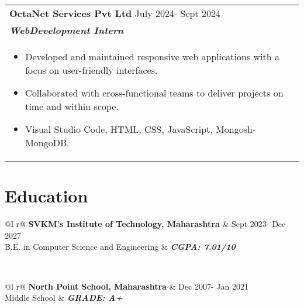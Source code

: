 \documentclass[a4paper,8pt]{article}
\begin{document}
\begin{tabularx}{\linewidth}{ @{}l r@{} }
\textbf{{OctaNet Services Pvt Ltd}} \hfill \color[HTML]{371e77}  July 2024- Sept 2024\\[4pt]
\color[HTML]{371e77}\textbf{\textit{WebDevelopment Intern}}\ \hfill \color[HTML]{4B28A4} \\[5pt]
\begin{minipage}[t]{\linewidth}
    \begin{itemize}[nosep,after=\strut, leftmargin=2em, itemsep=2pt]
        \item Developed and maintained responsive web applications with a focus on user-friendly interfaces.
        \item Collaborated with cross-functional teams to deliver projects on time and within scope.
        \item  Visual Studio Code, HTML, CSS, JavaScript, Mongosh-MongoDB.
    \end{itemize}
\end{minipage}
\end{tabularx}
\vspace{4pt}



\section{Education}
\begin{tabularx}{\linewidth}{ @{}l r@{} }
\color[HTML]{1C033C} \textbf{SVKM’s Institute of Technology, Maharashtra} & \hfill \color[HTML]{371e77} Sept 2023- Dec 2027 \\
\color[HTML]{371e77} B.E. in Computer Science and Engineering & \hfill \color[HTML]{4B28A4} \textit{\textbf{CGPA: 7.01/10}} \\
\end{tabularx}\\[3pt]


\begin{tabularx}{\linewidth}{ @{}l r@{} }
\color[HTML]{1C033C} \textbf{North Point School, Maharashtra} & \hfill \color[HTML]{371e77} Dec 2007- Jan 2021 \\
\color[HTML]{371e77} Middle School & \hfill \color[HTML]{4B28A4} \textit{\textbf{GRADE: A+}} \\
\end{tabularx}\\[3pt]
\end{document}
